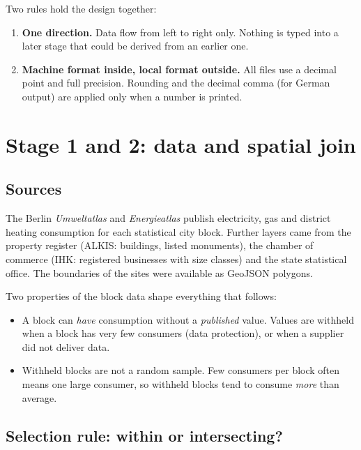 \documentclass[11pt,a4paper]{article}
\begin{document}
Two rules hold the design together:
\begin{enumerate}
  \item \textbf{One direction.} Data flow from left to right only. Nothing is
        typed into a later stage that could be derived from an earlier one.
  \item \textbf{Machine format inside, local format outside.} All files use a
        decimal point and full precision. Rounding and the decimal comma (for
        German output) are applied only when a number is printed.
\end{enumerate}

\section{Stage 1 and 2: data and spatial join}

\subsection{Sources}

The Berlin \emph{Umweltatlas} and \emph{Energieatlas} publish electricity, gas
and district heating consumption for each statistical city block. Further
layers came from the property register (ALKIS: buildings, listed monuments),
the chamber of commerce (IHK: registered businesses with size classes) and the
state statistical office. The boundaries of the sites were available as
GeoJSON polygons.

Two properties of the block data shape everything that follows:
\begin{itemize}
  \item A block can \emph{have} consumption without a \emph{published} value.
        Values are withheld when a block has very few consumers (data
        protection), or when a supplier did not deliver data.
  \item Withheld blocks are not a random sample. Few consumers per block often
        means one large consumer, so withheld blocks tend to consume
        \emph{more} than average.
\end{itemize}

\subsection{Selection rule: within or intersecting?}
\end{document}
